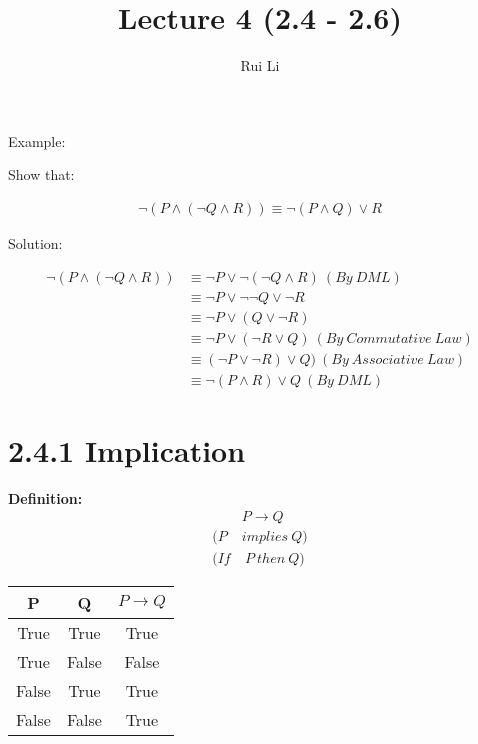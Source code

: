 \documentclass[11pt]{article}
\title{Lecture 4 (2.4 - 2.6)}
\author{Rui Li}
\begin{document}
\maketitle
\tableofcontents

\bigskip

Example: 

Show that:

\begin{align*}
    \neg(P \wedge (\neg Q \wedge R)) \equiv \neg(P \wedge Q) \vee R
\end{align*}

Solution:

\begin{align*}
    \neg(P \wedge (\neg Q \wedge R)) &\equiv \neg P \vee \neg(\neg Q \wedge R)\ (By\ DML)\\
    &\equiv \neg P \vee \neg \neg Q \vee \neg R\\
    &\equiv \neg P \vee (Q \vee \neg R)\\
    &\equiv \neg P \vee (\neg R \vee Q)\ (By\ Commutative\ Law)\\
    &\equiv (\neg P \vee \neg R) \vee Q)\ (By\ Associative\ Law)\\
    &\equiv \neg(P \wedge R) \vee Q\ (By\ DML)
\end{align*}

\section*{2.4.1 Implication}

\textbf{Definition: }
\begin{align*}
    &P \rightarrow Q\\
    (P\ &implies\ Q)\\
    (If&\ P\ then\ Q)
\end{align*}

\begin{center}
    \begin{tabular}{ |c|c|c| } 
        \hline
        P & Q & $P \rightarrow Q$ \\ 
        \hline
        True & True & True \\ 
        True & False & False \\
        False & True & True \\
        False & False & True \\ 
        \hline
    \end{tabular}
\end{center}
\end{document}
